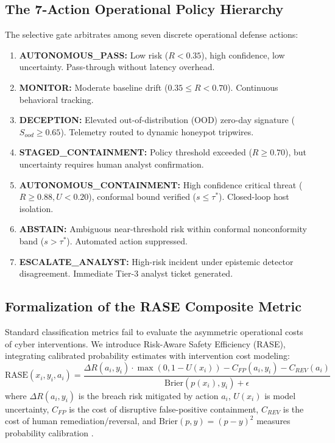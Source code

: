 \documentclass[10pt,journal,compsoc]{IEEEtran}
\begin{document}
\subsection{The 7-Action Operational Policy Hierarchy}
The selective gate arbitrates among seven discrete operational defense actions:
\begin{enumerate}
    \item \textbf{AUTONOMOUS\_PASS:} Low risk ($R < 0.35$), high confidence, low uncertainty. Pass-through without latency overhead.
    \item \textbf{MONITOR:} Moderate baseline drift ($0.35 \le R < 0.70$). Continuous behavioral tracking.
    \item \textbf{DECEPTION:} Elevated out-of-distribution (OOD) zero-day signature ($S_{ood} \ge 0.65$). Telemetry routed to dynamic honeypot tripwires.
    \item \textbf{STAGED\_CONTAINMENT:} Policy threshold exceeded ($R \ge 0.70$), but uncertainty requires human analyst confirmation.
    \item \textbf{AUTONOMOUS\_CONTAINMENT:} High confidence critical threat ($R \ge 0.88, U < 0.20$), conformal bound verified ($s \le \tau^*$). Closed-loop host isolation.
    \item \textbf{ABSTAIN:} Ambiguous near-threshold risk within conformal nonconformity band ($s > \tau^*$). Automated action suppressed.
    \item \textbf{ESCALATE\_ANALYST:} High-risk incident under epistemic detector disagreement. Immediate Tier-3 analyst ticket generated.
\end{enumerate}

\subsection{Formalization of the RASE Composite Metric}
Standard classification metrics fail to evaluate the asymmetric operational costs of cyber interventions. We introduce Risk-Aware Safety Efficiency (RASE), integrating calibrated probability estimates with intervention cost modeling:
\begin{equation}
\text{RASE}(x_i, y_i, a_i) = \frac{\Delta R(a_i, y_i) \cdot \max(0, 1 - U(x_i)) - C_{FP}(a_i, y_i) - C_{REV}(a_i)}{\text{Brier}(p(x_i), y_i) + \epsilon}
\end{equation}
where $\Delta R(a_i, y_i)$ is the breach risk mitigated by action $a_i$, $U(x_i)$ is model uncertainty, $C_{FP}$ is the cost of disruptive false-positive containment, $C_{REV}$ is the cost of human remediation/reversal, and $\text{Brier}(p, y) = (p - y)^2$ measures probability calibration \cite{brier1950verification}.
\end{document}
